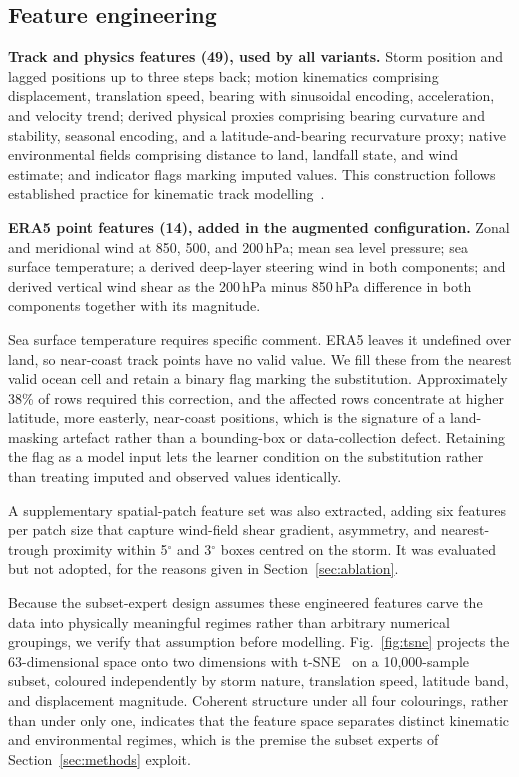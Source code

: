 \documentclass{ametsocv6.1}
\newcommand{\era}{ERA5}
\begin{document}
\subsection{Feature engineering}
\textbf{Track and physics features (49), used by all variants.} Storm position and
lagged positions up to three steps back; motion kinematics comprising
displacement, translation speed, bearing with sinusoidal encoding, acceleration,
and velocity trend; derived physical proxies comprising bearing curvature and
stability, seasonal encoding, and a latitude-and-bearing recurvature proxy;
native environmental fields comprising distance to land, landfall state, and wind
estimate; and indicator flags marking imputed values. This construction follows
established practice for kinematic track
modelling~\citep{krishnamurti2010ann,lian2020novel}.

\textbf{\era{} point features (14), added in the augmented configuration.} Zonal
and meridional wind at 850, 500, and 200\,hPa; mean sea level pressure; sea
surface temperature; a derived deep-layer steering wind in both components; and
derived vertical wind shear as the 200\,hPa minus 850\,hPa difference in both
components together with its magnitude.

Sea surface temperature requires specific comment. \era{} leaves it undefined
over land, so near-coast track points have no valid value. We fill these from the
nearest valid ocean cell and retain a binary flag marking the substitution.
Approximately 38\% of rows required this correction, and the affected rows
concentrate at higher latitude, more easterly, near-coast positions, which is the
signature of a land-masking artefact rather than a bounding-box or
data-collection defect. Retaining the flag as a model input lets the learner
condition on the substitution rather than treating imputed and observed values
identically.

A supplementary spatial-patch feature set was also extracted, adding six features
per patch size that capture wind-field shear gradient, asymmetry, and nearest-trough
proximity within 5$^\circ$ and 3$^\circ$ boxes centred on the storm. It was
evaluated but not adopted, for the reasons given in Section~\ref{sec:ablation}.

Because the subset-expert design assumes these engineered features carve the data
into physically meaningful regimes rather than arbitrary numerical groupings, we
verify that assumption before modelling. Fig.~\ref{fig:tsne} projects the
63-dimensional space onto two dimensions with t-SNE~\citep{maaten2008tsne} on a
10{,}000-sample subset, coloured independently by storm nature, translation speed,
latitude band, and displacement magnitude. Coherent structure under all four
colourings, rather than under only one, indicates that the feature space separates
distinct kinematic and environmental regimes, which is the premise the subset
experts of Section~\ref{sec:methods} exploit.
\end{document}
